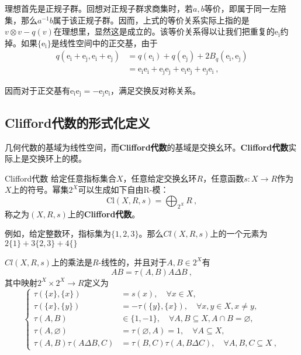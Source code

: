 理想首先是正规子群。回想对正规子群求商集时，若$a,b$等价，即属于同一左陪集，那么$a^{-1}b$属于该正规子群。因而，上式的等价关系实际上指的是
$v \otimes v-q(v)$在理想里，显然这是成立的。该等价关系得以让我们把重复的$\mathrm {e_i}$约掉。如果$\{\mathrm{e_i}\}$是线性空间中的正交基，由于
\begin{equation}
\begin{aligned}
q(\mathrm{e_i+e_j,e_i+e_j})&=q(\mathrm{e_i})+q(\mathrm{e_j})+2 B_q(\mathrm{e_i,e_j})\\
&=\mathrm{e_ie_i+e_je_j+e_ie_j+e_je_i}~,
\end{aligned}
\end{equation}

因而对于正交基有$\mathrm{e_ie_j=-e_je_i}$，满足交换反对称关系。

\subsection{Clifford代数的形式化定义}
几何代数的基域为线性空间，而\textbf{Clifford代数}的基域是交换幺环。\textbf{Clifford代数}实际上是交换环上的模。
\begin{definition}{Clifford代数}
给定任意指标集合$X$，任意给定交换幺环$R$，任意函数$s:X\rightarrow {R}$作为$X$上的符号。幂集$2^X$可以生成如下自由R-模：
\begin{equation}
\mathrm{Cl}(X,R,s)=\bigoplus_{2^X}R~,
\end{equation}
称之为$(X,R,s)$上的\textbf{Clifford代数}。
\end{definition}

例如，给定整数环，指标集为$\{1,2,3\}$。那么$Cl(X,R,s)$上的一个元素为$2\{1\}+3\{2,3\}+4\{\}$


$Cl(X,R,s)$上的乘法是$R$-线性的，并且对于$A,B\in 2^X$有
\begin{equation}
AB=\tau(A,B)A\Delta B~,
\end{equation}
其中映射$2^X \times 2^X \rightarrow R$定义为
\begin{equation}
\left\{\begin{aligned}
\tau(\{x\},\{x\}) & =s(x), \quad \forall x \in X, \\
\tau(\{x\},\{y\}) & =-\tau(\{y\},\{x\}), \quad \forall x, y \in X, x \neq y, \\
\tau(A, B) & \in\{1,-1\}, \quad \forall A, B \subseteq X, A \cap B=\varnothing, \\
\tau(A, \varnothing) & =\tau(\varnothing, A)=1, \quad \forall A \subseteq X, \\
\tau(A, B) \tau(A \Delta B, C) & =\tau(B, C) \tau(A, B \Delta C), \quad \forall A, B, C \subseteq X~,
\end{aligned}\right.
\end{equation}







